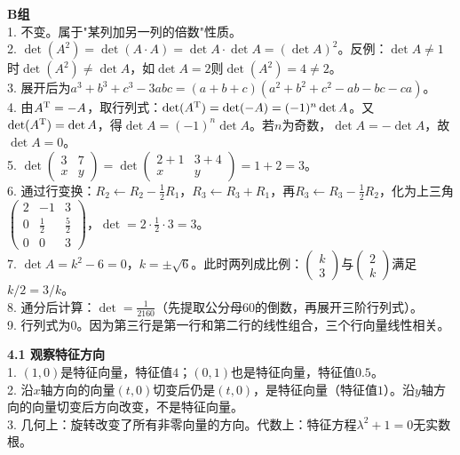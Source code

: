 \noindent\textbf{B组}\\
1. 不变。属于"某列加另一列的倍数"性质。\\
2. $\det(A^2)=\det(A\cdot A)=\det A\cdot\det A=(\det A)^2$。反例：$\det A\neq1$时$\det(A^2)\neq\det A$，如$\det A=2$则$\det(A^2)=4\neq2$。\\
3. 展开后为$a^3+b^3+c^3-3abc=(a+b+c)(a^2+b^2+c^2-ab-bc-ca)$。\\
4. 由$A^{\text T}=-A$，取行列式：$\det(A^{\text T})=\det(-A)=(-1)^n\det A$。又$\det(A^{\text T})=\det A$，得$\det A=(-1)^n\det A$。若$n$为奇数，$\det A=-\det A$，故$\det A=0$。\\
5. $\det\begin{pmatrix}3&7\\x&y\end{pmatrix}=\det\begin{pmatrix}2+1&3+4\\x&y\end{pmatrix}=1+2=3$。\\
6. 通过行变换：$R_2\leftarrow R_2-\frac12 R_1$，$R_3\leftarrow R_3+R_1$，再$R_3\leftarrow R_3-\frac12 R_2$，化为上三角$\begin{pmatrix}2&-1&3\\0&\frac12&\frac52\\0&0&3\end{pmatrix}$，$\det=2\cdot\frac12\cdot3=3$。\\
7. $\det A=k^2-6=0$，$k=\pm\sqrt6$。此时两列成比例：$\begin{pmatrix}k\\3\end{pmatrix}$与$\begin{pmatrix}2\\k\end{pmatrix}$满足$k/2=3/k$。\\
8. 通分后计算：$\det=\frac{1}{2160}$（先提取公分母$60$的倒数，再展开三阶行列式）。\\
9. 行列式为$0$。因为第三行是第一行和第二行的线性组合，三个行向量线性相关。\\


\noindent\textbf{4.1 观察特征方向}\\
1. $(1,0)$是特征向量，特征值$4$；$(0,1)$也是特征向量，特征值$0.5$。\\
2. 沿$x$轴方向的向量$(t,0)$切变后仍是$(t,0)$，是特征向量（特征值$1$）。沿$y$轴方向的向量切变后方向改变，不是特征向量。\\
3. 几何上：旋转改变了所有非零向量的方向。代数上：特征方程$\lambda^2+1=0$无实数根。

